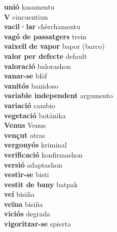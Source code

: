 \textbf{ unió  } kasamentu \\
\textbf{ V  } cincuentiun \\
\textbf{ vacil·lar  } chèrchamentu \\
\textbf{ vagó de passatgers  } trein \\
\textbf{ vaixell de vapor  } bapor (barco) \\
\textbf{ valor per defecte  } default \\
\textbf{ valoració  } balorashon \\
\textbf{ vanar-se  } blòf \\
\textbf{ vanitós  } banidoso \\
\textbf{ variable independent  } argumento \\
\textbf{ variació  } cambio \\
\textbf{ vegetació  } botánika \\
\textbf{ Venus  } Venus \\
\textbf{ vençut  } atras \\
\textbf{ vergonyós  } kriminal \\
\textbf{ verificació  } konfirmashon \\
\textbf{ versió  } adaptashon \\
\textbf{ vestir-se  } bisti \\
\textbf{ vestit de bany  } batpak \\
\textbf{ veí  } bisiña \\
\textbf{ veïna  } bisiña \\
\textbf{ viciós  } degrada \\
\textbf{ vigoritzar-se  } spierta \\
